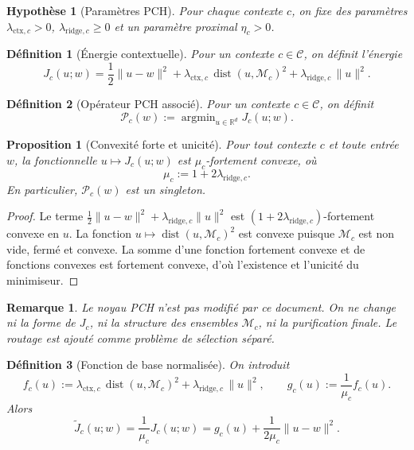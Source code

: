 \documentclass[11pt,a4paper]{article}
\newtheorem{definition}{Définition}[section]
\newtheorem{assumption}{Hypothèse}[section]
\newtheorem{proposition}{Proposition}[section]
\newtheorem{remark}{Remarque}[section]
\DeclareMathOperator{\argmin}{argmin}
\DeclareMathOperator{\dist}{dist}
\newcommand{\R}{\mathbb R}
\newcommand{\Mcal}{\mathcal M}
\newcommand{\Ccal}{\mathcal C}
\newcommand{\Pcal}{\mathcal P}
\begin{document}
\begin{assumption}[Paramètres PCH]
Pour chaque contexte \(c\), on fixe des paramètres \(\lambda_{\mathrm{ctx},c}>0\), \(\lambda_{\mathrm{ridge},c}\ge 0\) et un paramètre proximal \(\eta_c>0\).
\end{assumption}

\begin{definition}[Énergie contextuelle]
Pour un contexte \(c\in\Ccal\), on définit l'énergie
\[
J_c(u;w)=\frac12\|u-w\|^2+\lambda_{\mathrm{ctx},c}\,\dist(u,\Mcal_c)^2+\lambda_{\mathrm{ridge},c}\,\|u\|^2.
\]
\end{definition}

\begin{definition}[Opérateur PCH associé]
Pour un contexte \(c\in\Ccal\), on définit
\[
\Pcal_c(w):=\argmin_{u\in\R^d} J_c(u;w).
\]
\end{definition}

\begin{proposition}[Convexité forte et unicité]
Pour tout contexte \(c\) et toute entrée \(w\), la fonctionnelle \(u\mapsto J_c(u;w)\) est \(\mu_c\)-fortement convexe, où
\[
\mu_c:=1+2\lambda_{\mathrm{ridge},c}.
\]
En particulier, \(\Pcal_c(w)\) est un singleton.
\end{proposition}

\begin{proof}
Le terme \(\frac12\|u-w\|^2+\lambda_{\mathrm{ridge},c}\|u\|^2\) est \((1+2\lambda_{\mathrm{ridge},c})\)-fortement convexe en \(u\). La fonction \(u\mapsto \dist(u,\Mcal_c)^2\) est convexe puisque \(\Mcal_c\) est non vide, fermé et convexe. La somme d'une fonction fortement convexe et de fonctions convexes est fortement convexe, d'où l'existence et l'unicité du minimiseur.
\end{proof}

\begin{remark}
Le noyau PCH n'est pas modifié par ce document. On ne change ni la forme de \(J_c\), ni la structure des ensembles \(\Mcal_c\), ni la purification finale. Le routage est ajouté comme problème de sélection séparé.
\end{remark}

\begin{definition}[Fonction de base normalisée]
On introduit
\[
f_c(u):=\lambda_{\mathrm{ctx},c}\,\dist(u,\Mcal_c)^2+\lambda_{\mathrm{ridge},c}\,\|u\|^2,
\qquad
g_c(u):=\frac{1}{\mu_c}f_c(u).
\]
Alors
\[
\widetilde J_c(u;w)=\frac{1}{\mu_c}J_c(u;w)
=
g_c(u)+\frac{1}{2\mu_c}\|u-w\|^2.
\]
\end{definition}
\end{document}
